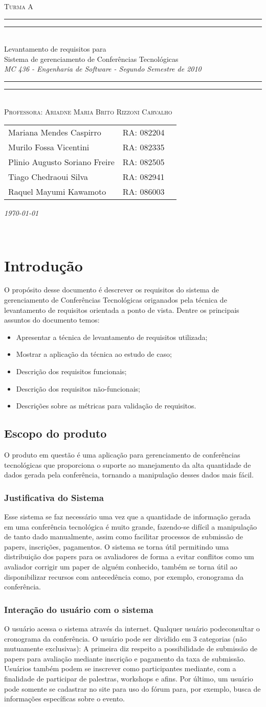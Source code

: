 \documentclass[letter]{article}
\newcommand*{\titleTMB}{\begingroup \centering \settowidth{\unitlength}{\LARGE MC 613} \vspace*{\baselineskip} {\large\scshape  Turma A}\\[\baselineskip] \rule{11.0cm}{1.6pt}\vspace*{-\baselineskip}\vspace*{2pt} \rule{11.0cm}{0.4pt}\\[\baselineskip] {\LARGE Levantamento de requisitos para }\\[0.2\baselineskip] {\LARGE Sistema de gerenciamento de Conferências Tecnológicas }\\[0.2\baselineskip] {\itshape MC 436 - Engenharia de Software - Segundo Semestre de 2010}\\[0.2\baselineskip] \rule{11.0cm}{0.4pt}\vspace*{-\baselineskip}\vspace{3.2pt} \rule{11.0cm}{1.6pt}\\[\baselineskip] {\large\scshape Professora: Ariadne Maria Brito Rizzoni Carvalho}\par \vfill {\normalsize   \scshape 
    \begin{center} 
      \begin{tabular}{  l  l  p{5cm} } 
        Mariana Mendes Caspirro & RA: 082204\\
        Murilo Fossa Vicentini & RA: 082335 \\
        Plinio Augusto Soriano Freire & RA:  082505\\
        Tiago Chedraoui Silva  & RA: 082941\\
Raquel Mayumi Kawamoto & RA: 086003 \\    
  \end{tabular} \end{center}
    \itshape \today }\\[\baselineskip] \vspace{3.2pt} \endgroup}
\begin{document}
\titleTMB 
\newpage


\tableofcontents

\newpage

\section{Introdução}
O propósito desse documento é descrever os requisitos do sistema
de gerenciamento de Conferências Tecnológicas
origanados pela técnica de levantamento de requisitos orientada a ponto de vista.
Dentre os principais assuntos do documento temos:

\begin{itemize}
\item Apresentar a técnica de levantamento de requisitos utilizada;
\item Mostrar a aplicação da técnica ao estudo de caso;
\item Descrição dos requisitos funcionais;
\item Descrição dos requisitos não-funcionais;
\item Descrições sobre as métricas para validação de requisitos.
\end{itemize}

\subsection{Escopo do produto }

O produto em questão é uma aplicação para gerenciamento de conferências tecnológicas que proporciona o suporte ao manejamento da alta quantidade de dados gerada pela conferência, tornando a manipulação desses dados mais fácil.
\subsubsection{Justificativa do Sistema}

Esse sistema se faz necessário uma vez que a quantidade de informação gerada em uma conferência tecnológica é muito grande, fazendo-se difícil a manipulação de tanto dado manualmente, assim como facilitar processos de submissão de papers, inscrições, pagamentos. O sistema se torna útil permitindo uma distribuição dos papers para os avaliadores de forma a evitar conflitos como um avaliador corrigir um paper de alguém conhecido, também se torna útil ao disponibilizar recursos com antecedência como, por exemplo, cronograma da conferência.


\subsubsection{Interação do usuário com o sistema}
O usuário acessa o sistema através da internet. Qualquer usuário podeconsultar o cronograma da conferência. O usuário pode ser dividido em 3 categorias (não mutuamente exclusivas): A primeira diz respeito a possibilidade de submissão de papers para avaliação mediante inscrição e pagamento da taxa de submissão. Usuários também podem se inscrever como participantes mediante, com a finalidade de participar de palestras, workshops e afins. Por último, um usuário pode somente se cadastrar no site para uso do fórum para, por exemplo, busca de informações específicas sobre o evento.
\end{document}
